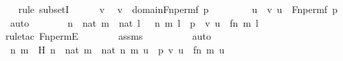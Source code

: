 \begin{isabellebody}
\ \ \isamarkupfalse%
{\isacharparenleft}{\kern0pt}rule\ subsetI{\isacharparenright}{\kern0pt}\isanewline
\ \ \ \ \isamarkupfalse%
\ v\ \isamarkupfalse%
\ {\isachardoublequoteopen}v\ {\isasymin}\ domain{\isacharparenleft}{\kern0pt}Fn{\isacharunderscore}{\kern0pt}perm{\isacharparenleft}{\kern0pt}f{\isacharcomma}{\kern0pt}\ p{\isacharparenright}{\kern0pt}{\isacharparenright}{\kern0pt}{\isachardoublequoteclose}\ \isanewline
\ \ \ \ \isamarkupfalse%
\ \isamarkupfalse%
\ u\ \ {\isachardoublequoteopen}{\isacharless}{\kern0pt}v{\isacharcomma}{\kern0pt}\ u{\isachargreater}{\kern0pt}\ {\isasymin}\ Fn{\isacharunderscore}{\kern0pt}perm{\isacharparenleft}{\kern0pt}f{\isacharcomma}{\kern0pt}\ p{\isacharparenright}{\kern0pt}{\isachardoublequoteclose}\ \isamarkupfalse%
\ auto\isanewline
\ \ \ \ \isamarkupfalse%
\ \isamarkupfalse%
\ {\isachardoublequoteopen}{\isasymexists}n\ {\isasymin}\ nat{\isachardot}{\kern0pt}\ {\isasymexists}m\ {\isasymin}\ nat{\isachardot}{\kern0pt}\ {\isasymexists}l\ {\isasymin}\ {}{\isachardot}{\kern0pt}\ {\isacharless}{\kern0pt}{\isacharless}{\kern0pt}n{\isacharcomma}{\kern0pt}\ m{\isachargreater}{\kern0pt}{\isacharcomma}{\kern0pt}\ l{\isachargreater}{\kern0pt}\ {\isasymin}\ p\ {\isasymand}\ {\isacharless}{\kern0pt}v{\isacharcomma}{\kern0pt}\ u{\isachargreater}{\kern0pt}\ {\isacharequal}{\kern0pt}\ {\isacharless}{\kern0pt}{\isacharless}{\kern0pt}f{\isacharbackquote}{\kern0pt}n{\isacharcomma}{\kern0pt}\ m{\isachargreater}{\kern0pt}{\isacharcomma}{\kern0pt}\ l{\isachargreater}{\kern0pt}{\isachardoublequoteclose}\ \isanewline
\ \ \ \ \ \ \isamarkupfalse%
{\isacharparenleft}{\kern0pt}rule{\isacharunderscore}{\kern0pt}tac\ Fn{\isacharunderscore}{\kern0pt}permE{\isacharparenright}{\kern0pt}\isanewline
\ \ \ \ \ \ \isamarkupfalse%
\ assms\ \ \isanewline
\ \ \ \ \ \ \isamarkupfalse%
\ auto\isanewline
\ \ \ \ \isamarkupfalse%
\ \isamarkupfalse%
\ n\ m\ \ H{\isacharcolon}{\kern0pt}\ {\isachardoublequoteopen}n\ {\isasymin}\ nat{\isachardoublequoteclose}\ {\isachardoublequoteopen}m\ {\isasymin}\ nat{\isachardoublequoteclose}\ {\isachardoublequoteopen}{\isacharless}{\kern0pt}{\isacharless}{\kern0pt}n{\isacharcomma}{\kern0pt}\ m{\isachargreater}{\kern0pt}{\isacharcomma}{\kern0pt}\ u{\isachargreater}{\kern0pt}\ {\isasymin}\ p{\isachardoublequoteclose}\ {\isachardoublequoteopen}{\isacharless}{\kern0pt}v{\isacharcomma}{\kern0pt}\ u{\isachargreater}{\kern0pt}\ {\isacharequal}{\kern0pt}\ {\isacharless}{\kern0pt}{\isacharless}{\kern0pt}f{\isacharbackquote}{\kern0pt}n{\isacharcomma}{\kern0pt}\ m{\isachargreater}{\kern0pt}{\isacharcomma}{\kern0pt}\ u{\isachargreater}{\kern0pt}{\isachardoublequoteclose}\ \isamarkupfalse%

\end{isabellebody}
